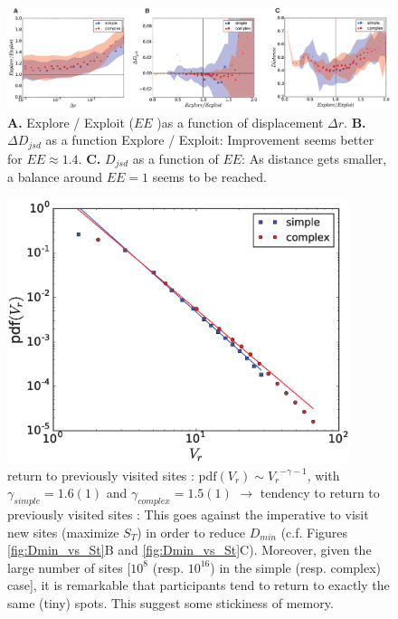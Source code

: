 \begin{figure}[h!]
\begin{center}
\includegraphics[width=18cm]{figures/EE.eps}
\caption{{\bf A.} Explore / Exploit ($EE$ )as a function of displacement $\Delta r$. {\bf B.} $\Delta D_{jsd}$ as a function Explore / Exploit: Improvement seems better for $EE \approx 1.4$. {\bf C.} $D_{jsd}$ as a function of $EE$: As distance gets smaller, a balance around $EE = 1$ seems to be reached.}
\label{fig:pdf_return}
\end{center}
\end{figure}

\begin{figure}[h!]
\begin{center}
\includegraphics[width=10cm]{figures/pdf_return.eps}
\caption{return to previously visited sites : $\mathrm{pdf}(V_r) \sim {V_r}^{- \gamma -1}$, with $\gamma_{simple} = 1.6(1)$ and $\gamma_{complex} = 1.5(1)$ $\rightarrow$ tendency to return to previously visited sites : This goes against the imperative to visit new sites (maximize $S_T$) in order to reduce $D_{min}$ (c.f. Figures \ref{fig:Dmin_vs_St}B and \ref{fig:Dmin_vs_St}C). Moreover, given the large number of sites [$10^{8}$ (resp. $10^{16}$) in the simple (resp. complex) case], it is remarkable that participants tend to return to exactly the same (tiny) spots. This suggest some stickiness of memory.}
\label{fig:pdf_return}
\end{center}
\end{figure}




